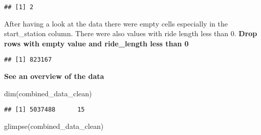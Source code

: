\documentclass[
]{article}
\newenvironment{Shaded}{\begin{snugshade}}{\end{snugshade}}
\newcommand{\DecValTok}[1]{\textcolor[rgb]{0.00,0.00,0.81}{#1}}
\newcommand{\FunctionTok}[1]{\textcolor[rgb]{0.00,0.00,0.00}{#1}}
\newcommand{\NormalTok}[1]{#1}
\newcommand{\OtherTok}[1]{\textcolor[rgb]{0.56,0.35,0.01}{#1}}
\newcommand{\SpecialCharTok}[1]{\textcolor[rgb]{0.00,0.00,0.00}{#1}}
\newcommand{\StringTok}[1]{\textcolor[rgb]{0.31,0.60,0.02}{#1}}
\begin{document}
\begin{verbatim}
## [1] 2
\end{verbatim}

After having a look at the data there were empty cells especially in the
start\_station column. There were also values with ride length less than
0. \textbf{Drop rows with empty value and ride\_length less than 0}

\begin{Shaded}
\end{Shaded}

\begin{verbatim}
## [1] 823167
\end{verbatim}

\begin{Shaded}
\end{Shaded}

\textbf{See an overview of the data}

\begin{Shaded}
\begin{Highlighting}[]
\FunctionTok{dim}\NormalTok{(combined\_data\_clean)}
\end{Highlighting}
\end{Shaded}

\begin{verbatim}
## [1] 5037488      15
\end{verbatim}

\begin{Shaded}
\begin{Highlighting}[]
\FunctionTok{glimpse}\NormalTok{(combined\_data\_clean)}
\end{Highlighting}
\end{Shaded}
\end{document}
